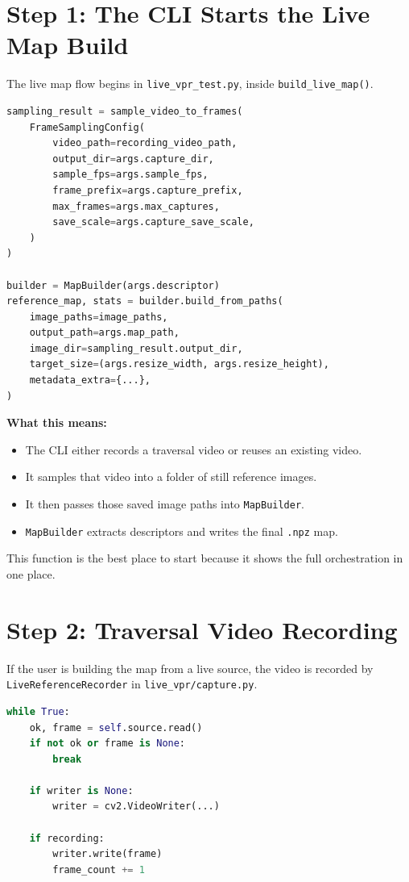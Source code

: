 \documentclass[11pt]{article}
\newcommand{\file}[1]{\texttt{#1}}
\newcommand{\code}[1]{\texttt{#1}}
\begin{document}
\section{Step 1: The CLI Starts the Live Map Build}
The live map flow begins in \file{live\_vpr\_test.py}, inside \code{build\_live\_map()}.

\begin{lstlisting}[style=repo,language=Python,caption={Core structure of \code{build\_live\_map()} in \file{live\_vpr\_test.py}.}]
sampling_result = sample_video_to_frames(
    FrameSamplingConfig(
        video_path=recording_video_path,
        output_dir=args.capture_dir,
        sample_fps=args.sample_fps,
        frame_prefix=args.capture_prefix,
        max_frames=args.max_captures,
        save_scale=args.capture_save_scale,
    )
)

builder = MapBuilder(args.descriptor)
reference_map, stats = builder.build_from_paths(
    image_paths=image_paths,
    output_path=args.map_path,
    image_dir=sampling_result.output_dir,
    target_size=(args.resize_width, args.resize_height),
    metadata_extra={...},
)
\end{lstlisting}

\textbf{What this means:}

\begin{itemize}[leftmargin=*]
  \item The CLI either records a traversal video or reuses an existing video.
  \item It samples that video into a folder of still reference images.
  \item It then passes those saved image paths into \code{MapBuilder}.
  \item \code{MapBuilder} extracts descriptors and writes the final \file{.npz} map.
\end{itemize}

This function is the best place to start because it shows the full orchestration in one place.

\section{Step 2: Traversal Video Recording}
If the user is building the map from a live source, the video is recorded by \code{LiveReferenceRecorder} in \file{live\_vpr/capture.py}.

\begin{lstlisting}[style=repo,language=Python,caption={Traversal recording loop in \file{live\_vpr/capture.py}.}]
while True:
    ok, frame = self.source.read()
    if not ok or frame is None:
        break

    if writer is None:
        writer = cv2.VideoWriter(...)

    if recording:
        writer.write(frame)
        frame_count += 1
\end{lstlisting}
\end{document}
